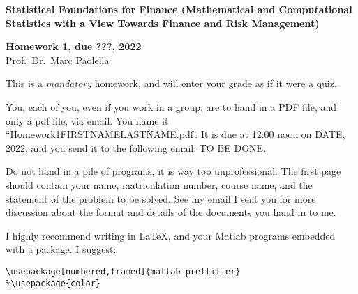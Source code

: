 \documentclass[12pt]{article}
\begin{document}
\pagestyle{empty}

\begin{Large}
	\begin{center}
		\textbf{Statistical Foundations for Finance (Mathematical and Computational Statistics with a View Towards Finance and Risk Management)}
	\end{center}
\end{Large}


\begin{large}	
	\begin{center}
		\textbf{Homework 1, due ???, 2022} \vspace{0.1cm} \\ {Prof.\ Dr.\ Marc Paolella }
	\end{center}
\end{large}

%
%


\bigskip
\bigskip

This is a \emph{mandatory} homework, and will enter your grade as if it were a quiz.

\medskip

You, each of you, even if you work in a group, are to hand in a PDF file, and only a pdf file, via email. You name it “Homework1FIRSTNAMELASTNAME.pdf’. It is due at 12:00 noon on DATE, 2022, and you send it to the following email: TO BE DONE.

\medskip

Do not hand in a pile of programs, it is way too unprofessional. The first page should contain your name, matriculation number, course name, and the statement of the problem to be solved. See my email I sent you for more discussion about the format and details of the documents you hand in to me. 

I highly recommend writing in \LaTeX, and your Matlab programs embedded with a package. I suggest:

\begin{verbatim}
\usepackage[numbered,framed]{matlab-prettifier}
%\usepackage{color}
\end{verbatim}
\end{document}

